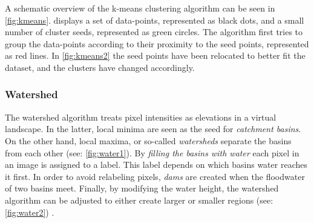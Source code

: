 \noindent
A schematic overview of the k-means clustering algorithm can be seen in \cref{fig:kmeans}.
 displays a set of data-points, represented as black dots, and a small number of
cluster seeds, represented as green circles.
The algorithm first tries to group the data-points according to their proximity to the seed points, represented as red lines.
In \cref{fig:kmeans2} the seed points have been relocated to better fit the dataset, and the clusters have changed accordingly.


\subsubsection{Watershed}
The watershed algorithm treats pixel intensities as elevations in a virtual landscape.
In the latter, local minima are seen as the seed for \textit{catchment basins}.
On the other hand, local maxima, or so-called \textit{watersheds} separate the basins from each other (see: \cref{fig:water1}).
By \textit{filling the basins with water} each pixel in an image is assigned to a label.
This label depends on which basins water reaches it first.
In order to avoid relabeling pixels, \textit{dams} are created when the floodwater of two basins meet.
Finally, by modifying the water height, the watershed algorithm can be adjusted to either create larger or smaller regions (see: \cref{fig:water2}) \cite{preimImageAnalysisMedical2014,hahnIWTinteractiveWatershedTransform2003}.
